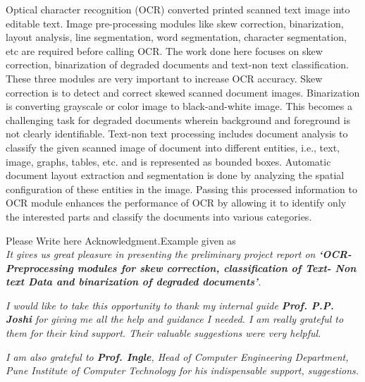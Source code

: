 \documentclass[oneside,a4paper,12pt]{report}
\begin{document}
		
{   \setlength{\parindent}{11mm} }
{ \setlength{\parindent}{0mm} }
Optical character recognition (OCR) converted printed scanned text image into editable text. Image pre-processing modules like skew correction, binarization, layout analysis, line segmentation,  word segmentation, character segmentation, etc are required before calling OCR. The work done here focuses on skew correction, binarization of degraded documents and text-non text classification. These three modules are very important to increase OCR accuracy. Skew correction is to detect and correct skewed scanned document images. Binarization is converting grayscale or color image to black-and-white image. This becomes a challenging task for degraded documents wherein background and foreground is not clearly identifiable. Text-non text processing includes document analysis to classify the given scanned image of document into different entities, i.e., text, image, graphs, tables, etc. and is represented as bounded boxes. Automatic document layout extraction and segmentation is done by analyzing the spatial configuration of these entities in the image. Passing this processed information to OCR module enhances the performance of OCR by allowing it to identify only the interested parts and classify the documents into various categories. 


{   \setlength{\parindent}{11mm} }
{ \setlength{\parindent}{0mm} }
Please Write here Acknowledgment.Example given as\\
\textit{It gives us great pleasure in presenting the preliminary project report 
on {\bfseries \fontsize{12}{12} \selectfont `OCR-Preprocessing modules for skew correction, classification of Text- Non text Data and binarization of degraded documents'}.}
\vspace*{1.5\baselineskip}

 \textit{I would like to take this opportunity to thank my internal guide
 \textbf{Prof. P.P. Joshi} for giving me all the help and guidance I needed. I am
 really grateful to them for their kind support. Their valuable suggestions were very helpful.} \vspace*{1.5\baselineskip}

 \textit{I am also grateful to \textbf{Prof. Ingle}, Head of Computer
 Engineering Department, Pune Institute of Computer Technology for his indispensable
 support, suggestions.}
\vspace*{1.5\baselineskip}
\end{document}
